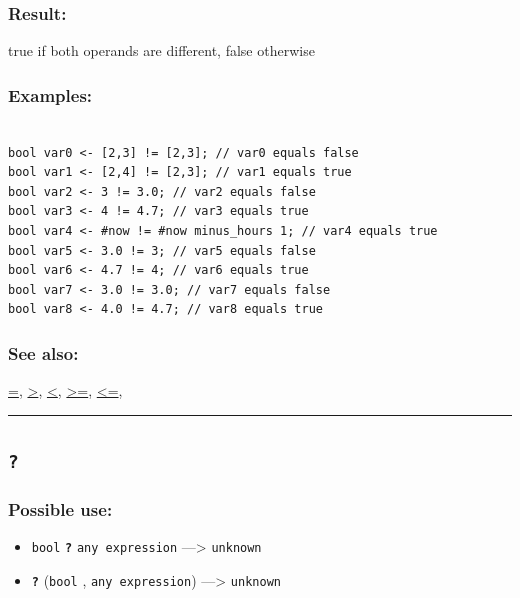 \documentclass[]{book}
\providecommand{\tightlist}{%
  \setlength{\itemsep}{0pt}\setlength{\parskip}{0pt}}
\theoremstyle{definition}
\theoremstyle{definition}
\theoremstyle{definition}
\theoremstyle{remark}
\begin{document}
\subsubsection{Result:}\label{result-3}

true if both operands are different, false otherwise

\subsubsection{Examples:}\label{examples-2}

\begin{verbatim}
 
bool var0 <- [2,3] != [2,3]; // var0 equals false 
bool var1 <- [2,4] != [2,3]; // var1 equals true 
bool var2 <- 3 != 3.0; // var2 equals false 
bool var3 <- 4 != 4.7; // var3 equals true 
bool var4 <- #now != #now minus_hours 1; // var4 equals true 
bool var5 <- 3.0 != 3; // var5 equals false 
bool var6 <- 4.7 != 4; // var6 equals true 
bool var7 <- 3.0 != 3.0; // var7 equals false 
bool var8 <- 4.0 != 4.7; // var8 equals true
\end{verbatim}

\subsubsection{See also:}\label{see-also-3}

\href{operators-a-to-a.html\#=}{=},
\href{operators-a-to-a.html\#\%3E}{\textgreater{}},
\href{operators-a-to-a.html\#\%3C}{\textless{}},
\href{operators-a-to-a.html\#\%3E=}{\textgreater{}=},
\href{operators-a-to-a.html\#\%3C=}{\textless{}=},

\begin{center}\rule{0.5\linewidth}{\linethickness}\end{center}

\subsection{\texorpdfstring{\texttt{?}}{?}}\label{section-5}

\subsubsection{Possible use:}\label{possible-use-5}

\begin{itemize}
\tightlist
\item
  \texttt{bool} \textbf{\texttt{?}} \texttt{any\ expression}
  ---\textgreater{} \texttt{unknown}
\item
  \textbf{\texttt{?}} (\texttt{bool} , \texttt{any\ expression})
  ---\textgreater{} \texttt{unknown}
\end{itemize}
\end{document}
